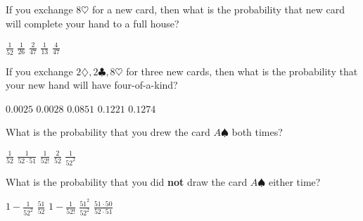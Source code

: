 \documentclass[answers,12pt]{exam}
\begin{document}
\begin{questions}

\question\label{FirstPoker} 
If you exchange $8\heartsuit$ for a new card,
then what is the probability that new card
will complete your hand to a full house?\\
\begin{oneparchoices}
\choice $\frac{1}{52}$
\choice $\frac{1}{26}$ %
\choice $\frac{2}{47}$ %
\choice $\frac{1}{13}$ %
\correctchoice $\frac{4}{47}$
\end{oneparchoices}

\question\label{LastPoker}
If you exchange $2\diamondsuit,2\clubsuit,8\heartsuit$ for three
new cards, then what is the probability that your new hand
will have four-of-a-kind?\\
\begin{oneparchoices}
\choice $0.0025$ %
\correctchoice $0.0028$
\choice $0.0851$ %
\choice $0.1221$ %
\choice $0.1274$ %
\end{oneparchoices}


\question\label{FirstDeck} What is the probability that you
drew the card $A\spadesuit$ both times?\\
\begin{oneparchoices}
\choice $\frac{1}{52}$
\choice $\frac{1}{52\cdot 51}$
\choice $\frac{1}{52!}$
\choice $\frac{2}{52}$
\correctchoice $\frac{1}{52^2}$
\end{oneparchoices}

\question\label{LastDeck} What is the probability that you
did {\bf not} draw the card $A\spadesuit$ either time?\\
\begin{oneparchoices}
\choice $1-\frac{1}{52^2}$
\choice $\frac{51}{52}$
\choice $1-\frac{1}{52!}$
\correctchoice $\frac{51^2}{52^2}$
\choice $\frac{51\cdot 50}{52\cdot 51}$
\end{oneparchoices}



\end{questions}
\end{document}
